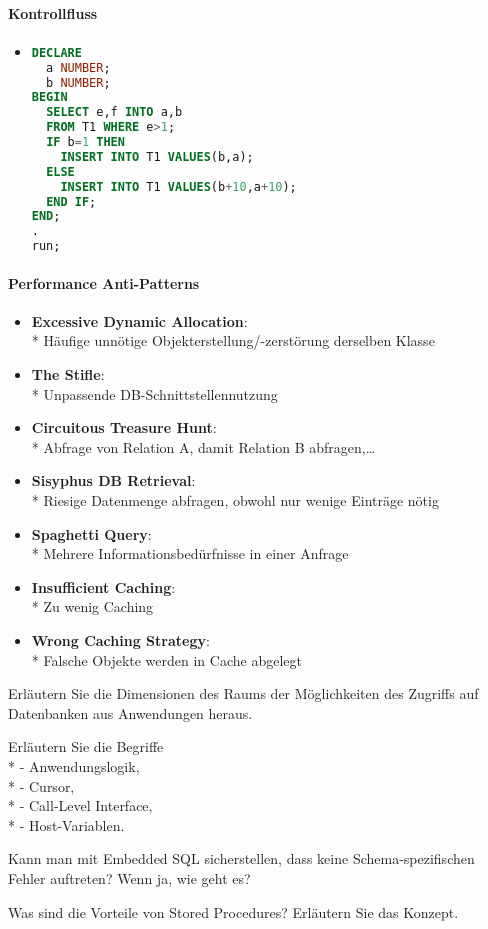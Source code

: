 \paragraph{Kontrollfluss}
\begin{itemize}
	\item
	\begin{lstlisting}[language=sql]
DECLARE
  a NUMBER;
  b NUMBER;
BEGIN
  SELECT e,f INTO a,b
  FROM T1 WHERE e>1;
  IF b=1 THEN
    INSERT INTO T1 VALUES(b,a);
  ELSE
    INSERT INTO T1 VALUES(b+10,a+10);
  END IF;
END;
.
run;
	\end{lstlisting}
\end{itemize}

\paragraph{Performance Anti-Patterns}
\begin{itemize}
	\item \textbf{Excessive Dynamic Allocation}:
		\\*
		Häufige unnötige Objekterstellung/-zerstörung derselben Klasse
	\item \textbf{The Stifle}:
		\\*
		Unpassende DB-Schnittstellennutzung
	\item \textbf{Circuitous Treasure Hunt}:
		\\*
		Abfrage von Relation A, damit Relation B abfragen,\dots
	\item \textbf{Sisyphus DB Retrieval}:
		\\*
		Riesige Datenmenge abfragen, obwohl nur wenige Einträge nötig
	\item \textbf{Spaghetti Query}:
		\\*
		Mehrere Informationsbedürfnisse in einer Anfrage
	\item \textbf{Insufficient Caching}:
		\\*
		Zu wenig Caching
	\item \textbf{Wrong Caching Strategy}:
		\\*
		Falsche Objekte werden in Cache abgelegt
\end{itemize}

\begin{fragen}
	\item Erläutern Sie die Dimensionen des Raums der Möglichkeiten des Zugriffs auf Datenbanken aus Anwendungen heraus.
	\item Erläutern Sie die Begriffe \\*
		- Anwendungslogik, \\*
		- Cursor, \\*
		- Call-Level Interface, \\*
		- Host-Variablen.
	\item Kann man mit Embedded SQL sicherstellen, dass keine Schema-spezifischen Fehler auftreten? Wenn ja, wie geht es?
	\item Was sind die Vorteile von Stored Procedures? Erläutern Sie das Konzept.
\end{fragen}